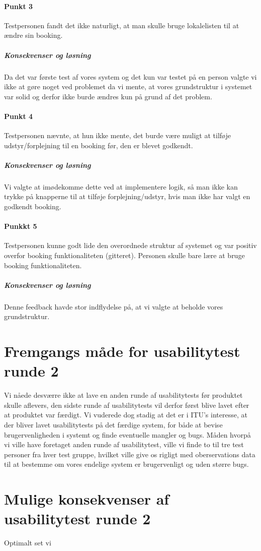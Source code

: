 \paragraph{Punkt 3}
Testpersonen fandt det ikke naturligt, at man skulle bruge lokalelisten til at ændre sin booking.
\subparagraph{Konsekvenser og løsning}
Da det var første test af vores system og det kun var testet på en person valgte vi ikke at gøre noget ved problemet da vi mente, at vores grundstruktur i systemet var solid og derfor ikke burde ændres kun på grund af det problem.

\paragraph{Punkt 4}
Testpersonen nævnte, at hun ikke mente, det burde være muligt at tilføje udstyr/forplejning til en booking før, den er blevet godkendt.
\subparagraph{Konsekvenser og løsning}
Vi valgte at imødekomme dette ved at implementere logik, så man ikke kan trykke på knapperne til at tilføje forplejning/udstyr, hvis man ikke har valgt en godkendt booking.

\paragraph{Punkkt 5}
Testpersonen kunne godt lide den overordnede struktur af systemet og var positiv overfor booking funktionaliteten (gitteret). Personen skulle bare lære at bruge booking funktionaliteten.
\subparagraph{Konsekvenser og løsning}
Denne feedback havde stor indflydelse på, at vi valgte at beholde vores grundstruktur.

\section{Fremgangs måde for usabilitytest runde 2}
\label{Usability_R2}
Vi nåede desværre ikke at lave en anden runde af usabilitytests før produktet skulle aflevers, den sidste runde af usabilitytests vil derfor først blive lavet efter at produktet var færdigt. Vi vuderede dog stadig at det er i ITU's interesse, at der bliver lavet usabilitytests på det færdige system, for både at bevise brugervenligheden i systemt og finde eventuelle mangler og bugs. Måden hvorpå vi ville have foretaget anden runde af usabilitytest, ville vi finde to til tre test personer fra hver test gruppe, hvilket ville give os rigligt med oberservations data til at bestemme om vores endelige system er brugervenligt og uden større bugs.

\section{Mulige konsekvenser af usabilitytest runde 2}
\label{Usability_R2_Possibilities}
Optimalt set vi
